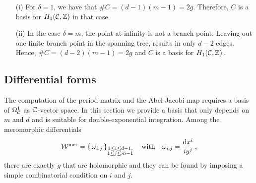 \documentclass[main.tex]{subfiles}
\begin{document}
  \begin{rmk}
  \begin{itemize}
   \item[(i)] For $\delta = 1$, we have that $\# C = (d-1)(m-1) = 2g$. Therefore, $C$ is a basis for $H_1(\mathcal{C},\mathbb{Z})$ in that case.
   \item[(ii)] In the case $\delta = m$, the point at infinity is not a branch point. Leaving out one finite branch point in the spanning tree, results in only $d-2$ edges. Hence,
   $\#C = (d-2)(m-1) = 2g$ and $C$ is a basis for $H_1(\mathcal{C},\mathbb{Z})$\,.
  \end{itemize}
  \end{rmk}


  
\subsection{Differential forms}\label{subsec:diff_forms}
  
    The computation of the period matrix and the Abel-Jacobi map requires a basis of $\Omega^1_{\mathcal{C}}$ as $\mathbb{C}$-vector space. In this section we provide a basis that only 
   depends on $m$ and $d$ and is suitable for double-exponential integration. \abstand
    Among the meromorphic differentials
    \begin{align*}
 \mathcal{W}^{\text{mer}} = \left\{ \, \omega_{i,j}  \, \right\}_{\substack{1 \le i \le d-1, \\ 1 \le j \le m-1}} \quad \text{with} \quad \omega_{i,j} = \frac{ \mathrm d x^i}{i y^j}\,,
  \end{align*}
  there are exactly $g$ that are holomorphic  and they can be found by imposing a simple combinatorial condition on $i$ and $j$.
 

   \bigskip
   
\end{document}
